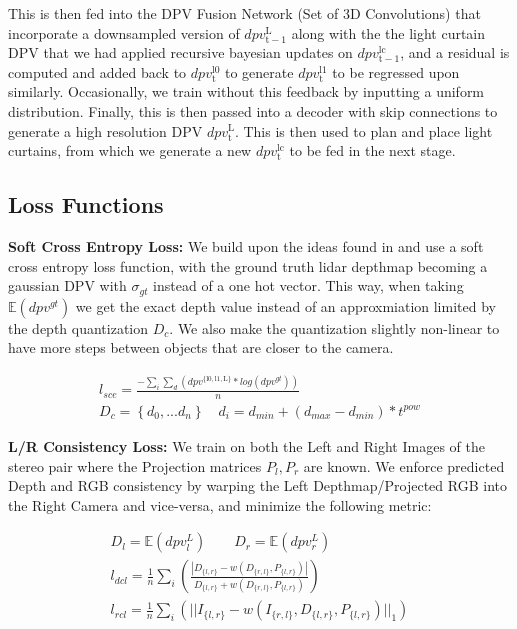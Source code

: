 This is then fed into the DPV Fusion Network (Set of 3D Convolutions) that incorporate a downsampled version of $dpv_{\mathrm{t-1}}^{\mathrm{L}}$ along with the the light curtain DPV that we had applied recursive bayesian updates on $dpv_{\mathrm{t-1}}^{\mathrm{lc}}$, and a residual is computed and added back to $dpv_{\mathrm{t}}^{\mathrm{l0}}$ to generate $dpv_{\mathrm{t}}^{\mathrm{l1}}$ to be regressed upon similarly. Occasionally, we train without this feedback by inputting a uniform distribution. Finally, this is then passed into a decoder with skip connections to generate a high resolution DPV $dpv_{\mathrm{t}}^{\mathrm{L}}$. This is then used to plan and place light curtains, from which we generate a new $dpv_{\mathrm{t}}^{\mathrm{lc}}$ to be fed in the next stage.

\subsection{Loss Functions}

\textbf{Soft Cross Entropy Loss:} We build upon the ideas found in \cite{Yang-2019-118007} and use a soft cross entropy loss function, with the ground truth lidar depthmap becoming a gaussian DPV with $\sigma_{gt}$ instead of a one hot vector. This way, when taking $\mathbb{E}\left(dpv^{gt}\right)$ we get the exact depth value instead of an approxmiation limited by the depth quantization $D_{c}$. We also make the quantization slightly non-linear to have more steps between objects that are closer to the camera.

\small
\begin{align}
    l_{sce}=\frac{-\sum_{i}\sum_{d}\left(dpv^{\mathrm{\{l0,l1,L\}}}*log\left(dpv^{gt}\right)\right)}{n} \\
    D_{c}=\left\{ d_{0},...d_{n}\right\} \quad d_{i}=d_{min}+(d_{max}-d_{min})*t^{pow}
   \label{eq:seloss}
\end{align}
\normalsize

\textbf{L/R Consistency Loss:} We train on both the Left and Right Images of the stereo pair where the Projection matrices $P_{l}, P_{r}$ are known. We enforce predicted Depth and RGB consistency by warping the Left Depthmap/Projected RGB into the Right Camera and vice-versa, and minimize the following metric:

\small
\begin{align}
    D_{l}=\mathbb{E}\left(dpv_{l}^{L}\right)\qquad D_{r}=\mathbb{E}\left(dpv_{r}^{L}\right) \\
    l_{dcl}=\frac{1}{n}\sum_{i}\left(\frac{\left|D_{\{l,r\}}-w\left(D_{\{r,l\}},P_{\{l,r\}}\right)\right|}{D_{\{l,r\}}+w\left(D_{\{r,l\}},P_{\{l,r\}}\right)}\right) \\
    l_{rcl}=\frac{1}{n}\sum_{i}\left(||I_{\{l,r\}}-w\left(I_{\{r,l\}},D_{\{l,r\}},P_{\{l,r\}}\right)||_{1}\right)
   \label{eq:lrcons} 
\end{align}
\normalsize

